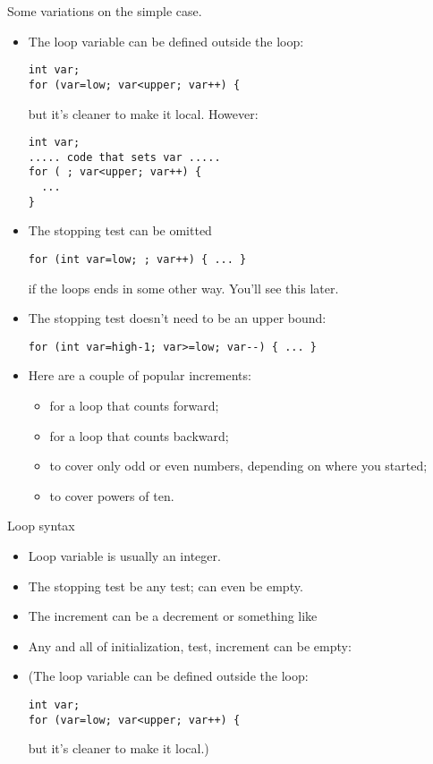 Some variations on the simple case.
\begin{itemize}
\item The loop variable can be defined outside the loop:
\begin{verbatim}
int var;
for (var=low; var<upper; var++) {
\end{verbatim}
but it's cleaner to make it local. However:
\begin{verbatim}
int var;
..... code that sets var .....
for ( ; var<upper; var++) {
  ...
}
\end{verbatim}
\item The stopping test can be omitted
\begin{verbatim}
for (int var=low; ; var++) { ... }
\end{verbatim}
if the loops ends in some other way. You'll see this later.
\item The stopping test doesn't need to be an upper bound:
\begin{verbatim}
for (int var=high-1; var>=low; var--) { ... }
\end{verbatim}
\item Here are a couple of popular increments:
  \begin{itemize}
  \item {} for a loop that counts forward;
  \item {} for a loop that counts backward;
  \item {} to cover only odd or even numbers, depending on
    where you started;
  \item {} to cover powers of ten.
  \end{itemize}
\end{itemize}

\begin{slide}{Loop syntax}
  \label{sl:for-syntax}
  \begin{itemize}
  \item Loop variable is usually an integer.
  \item The stopping test be any test; can even be empty.
  \item The increment can be a decrement or something like 
  \item Any and all of initialization, test, increment can be empty:\\
  \item (The loop variable can be defined outside the loop:
\begin{verbatim}
int var;
for (var=low; var<upper; var++) {
\end{verbatim}
but it's cleaner to make it local.)
  \end{itemize}
\end{slide}

